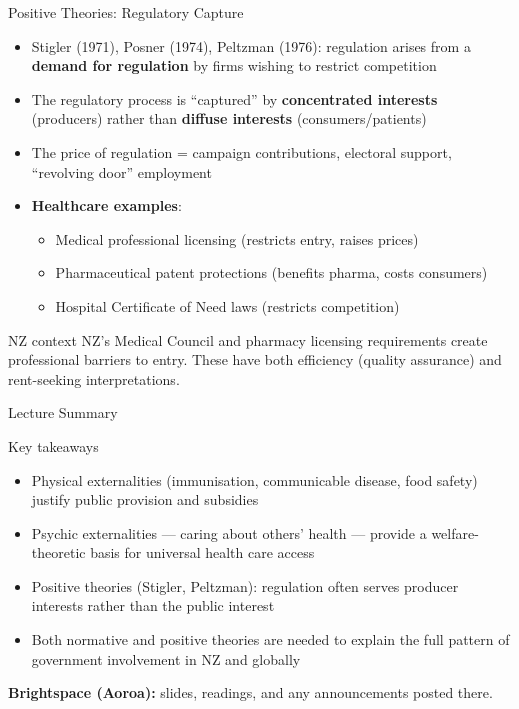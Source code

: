 \documentclass[aspectratio=169, 12pt]{beamer}
\newcommand{\summaryside}[1]{%
  \begin{frame}{Lecture Summary}
    \begin{exampleblock}{Key takeaways}
      \begin{itemize}#1\end{itemize}
    \end{exampleblock}
    \vspace{0.5em}
    {\footnotesize\textcolor{OtagoGold}{\textbf{Brightspace (Aoroa):}} slides, readings, and any announcements posted there.}
  \end{frame}}
\begin{document}
\begin{frame}{Positive Theories: Regulatory Capture}
  \begin{itemize}
    \item Stigler (1971), Posner (1974), Peltzman (1976): regulation arises from a
          \textbf{demand for regulation} by firms wishing to restrict competition
    \item The regulatory process is ``captured'' by \textbf{concentrated interests}
          (producers) rather than \textbf{diffuse interests} (consumers/patients)
    \item The price of regulation = campaign contributions, electoral support, ``revolving
          door'' employment
    \item \textbf{Healthcare examples}:
    \begin{itemize}
      \item Medical professional licensing (restricts entry, raises prices)
      \item Pharmaceutical patent protections (benefits pharma, costs consumers)
      \item Hospital Certificate of Need laws (restricts competition)
    \end{itemize}
  \end{itemize}
  \begin{alertblock}{NZ context}
    NZ's Medical Council and pharmacy licensing requirements create professional barriers
    to entry. These have both efficiency (quality assurance) and rent-seeking interpretations.
  \end{alertblock}
\end{frame}

\summaryside{
  \item Physical externalities (immunisation, communicable disease, food safety) justify public provision and subsidies
  \item Psychic externalities --- caring about others' health --- provide a welfare-theoretic basis for universal health care access
  \item Positive theories (Stigler, Peltzman): regulation often serves producer interests rather than the public interest
  \item Both normative and positive theories are needed to explain the full pattern of government involvement in NZ and globally
}

\end{document}

